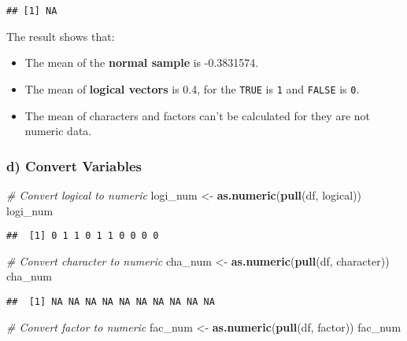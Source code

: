 \documentclass[
]{article}
\newenvironment{Shaded}{\begin{snugshade}}{\end{snugshade}}
\newcommand{\CommentTok}[1]{\textcolor[rgb]{0.56,0.35,0.01}{\textit{#1}}}
\newcommand{\FunctionTok}[1]{\textcolor[rgb]{0.13,0.29,0.53}{\textbf{#1}}}
\newcommand{\NormalTok}[1]{#1}
\newcommand{\OtherTok}[1]{\textcolor[rgb]{0.56,0.35,0.01}{#1}}
\providecommand{\tightlist}{%
  \setlength{\itemsep}{0pt}\setlength{\parskip}{0pt}}
\begin{document}
\begin{verbatim}
## [1] NA
\end{verbatim}

The result shows that:

\begin{itemize}
\tightlist
\item
  The mean of the \textbf{normal sample} is -0.3831574.
\item
  The mean of \textbf{logical vectors} is 0.4, for the \texttt{TRUE} is
  \texttt{1} and \texttt{FALSE} is \texttt{0}.
\item
  The mean of characters and factors can't be calculated for they are
  not numeric data.
\end{itemize}

\subsubsection{d) Convert Variables}\label{d-convert-variables}

\begin{Shaded}
\begin{Highlighting}[]
\CommentTok{\# Convert logical to numeric}
\NormalTok{logi\_num }\OtherTok{\textless{}{-}} \FunctionTok{as.numeric}\NormalTok{(}\FunctionTok{pull}\NormalTok{(df, logical))}
\NormalTok{logi\_num}
\end{Highlighting}
\end{Shaded}

\begin{verbatim}
##  [1] 0 1 1 0 1 1 0 0 0 0
\end{verbatim}

\begin{Shaded}
\begin{Highlighting}[]
\CommentTok{\# Convert character to numeric}
\NormalTok{cha\_num }\OtherTok{\textless{}{-}} \FunctionTok{as.numeric}\NormalTok{(}\FunctionTok{pull}\NormalTok{(df, character))}
\NormalTok{cha\_num}
\end{Highlighting}
\end{Shaded}

\begin{verbatim}
##  [1] NA NA NA NA NA NA NA NA NA NA
\end{verbatim}

\begin{Shaded}
\begin{Highlighting}[]
\CommentTok{\# Convert factor to numeric}
\NormalTok{fac\_num }\OtherTok{\textless{}{-}} \FunctionTok{as.numeric}\NormalTok{(}\FunctionTok{pull}\NormalTok{(df, factor))}
\NormalTok{fac\_num}
\end{Highlighting}
\end{Shaded}
\end{document}
